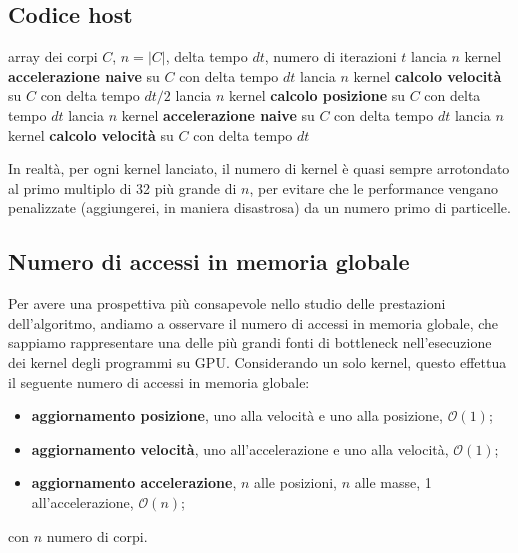 \documentclass{article}
\begin{document}
	\newpage
	\subsection{Codice host}
	
		\begin{algorithm}[htp]
		\caption{Simulazione $n$-body naive}
		\begin{algorithmic}[1]
		\Require array dei corpi $C$, $n = |C|$, delta tempo $dt$, numero di  iterazioni $t$
		\State lancia $n$ kernel \textbf{accelerazione naive} su $C$ con delta tempo $dt$ 
		\State lancia $n$ kernel \textbf{calcolo velocità} su $C$ con delta tempo $dt/2$ 
		\State lancia $n$ kernel \textbf{calcolo posizione} su $C$ con delta tempo $dt$ 
		\State lancia $n$ kernel \textbf{accelerazione naive} su $C$ con delta tempo $dt$ 
		\State lancia $n$ kernel \textbf{calcolo velocità} su $C$ con delta tempo $dt$ 
		\EndFor
		
		\end{algorithmic}
	\end{algorithm}
	In realtà, per ogni kernel lanciato, il numero di kernel è quasi sempre arrotondato al primo multiplo di 32 più grande di $n$, per evitare che le performance vengano penalizzate (aggiungerei, in maniera disastrosa) da un numero primo di particelle.
	
	\subsection{Numero di accessi in memoria globale}
	Per avere una prospettiva più consapevole nello studio delle prestazioni dell'algoritmo, andiamo a osservare il numero di accessi in memoria globale, che sappiamo rappresentare una delle più grandi fonti di bottleneck nell'esecuzione dei kernel degli programmi su GPU. Considerando un solo kernel, questo effettua il seguente numero di accessi in memoria globale:
	
	\begin{itemize}
		\item \textbf{aggiornamento posizione},  uno alla velocità e uno alla posizione, $\mathcal O(1)$;
		\item \textbf{aggiornamento velocità}, uno all'accelerazione e uno alla velocità, $\mathcal O(1)$;
		\item \textbf{aggiornamento accelerazione}, $n$ alle posizioni, $n$ alle masse, 1 all'accelerazione, $\mathcal O(n)$;
	\end{itemize}
	con $n$ numero di corpi.
	
\end{document}
